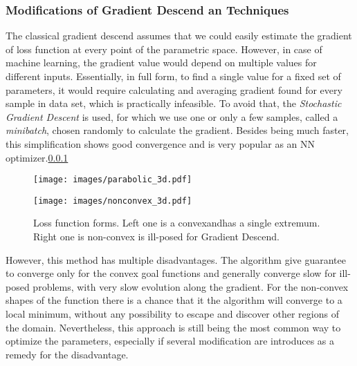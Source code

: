 \subsubsection{Modifications of Gradient Descend an Techniques}

The classical gradient descend assumes that we could easily estimate the gradient of loss function at every point of the parametric space.
However, in case of machine learning, the gradient value would depend on multiple values for different inputs.
Essentially, in full form, to find a single value for a fixed set of parameters, it would require calculating and averaging gradient found for every sample in data set, which is practically infeasible.
To avoid that, the \textit{Stochastic Gradient Descent} is used, for which we use one or only a few samples, called a \textit{minibatch}, chosen randomly to calculate the gradient.
Besides being much faster, this simplification shows good convergence and is very popular as an NN optimizer.\ref{}

\begin{figure*}
	\begin{multicols}{2}
		\texttt{[image: images/parabolic\_3d.pdf]}\par
		\texttt{[image: images/nonconvex\_3d.pdf]}\par
	\end{multicols}
	\caption{Loss function forms. Left one is a convexandhas a single extremum. Right one is non-convex is ill-posed for Gradient Descend. }
	\label{fig:lossfunc_demo}
\end{figure*}
	
However, this method has multiple disadvantages.
The algorithm give guarantee to converge only for the convex goal functions and generally converge slow for ill-posed problems, with very slow evolution along the gradient.
For the non-convex shapes of the function there is a chance that it the algorithm will converge to a local minimum, without any possibility to escape and discover other regions of the domain.
Nevertheless, this approach is still being the most common way to optimize the parameters, especially if several modification are introduces as a remedy for the disadvantage.
\medskip

